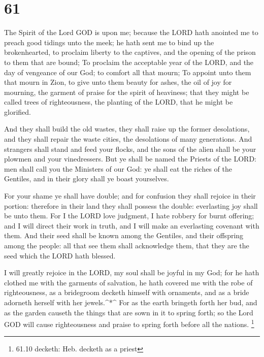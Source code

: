 \hypertarget{section-60}{%
\section{61}\label{section-60}}

 The Spirit of the Lord GOD is upon me; because the LORD
hath anointed me to preach good tidings unto the meek; he hath sent me
to bind up the brokenhearted, to proclaim liberty to the captives, and
the opening of the prison to them that are bound;  To
proclaim the acceptable year of the LORD, and the day of vengeance of
our God; to comfort all that mourn;  To appoint unto them
that mourn in Zion, to give unto them beauty for ashes, the oil of joy
for mourning, the garment of praise for the spirit of heaviness; that
they might be called trees of righteousness, the planting of the LORD,
that he might be glorified.

 And they shall build the old wastes, they shall raise up
the former desolations, and they shall repair the waste cities, the
desolations of many generations.  And strangers shall stand
and feed your flocks, and the sons of the alien shall be your plowmen
and your vinedressers.  But ye shall be named the Priests of
the LORD: men shall call you the Ministers of our God: ye shall eat the
riches of the Gentiles, and in their glory shall ye boast yourselves.

 For your shame ye shall have double; and for confusion they
shall rejoice in their portion: therefore in their land they shall
possess the double: everlasting joy shall be unto them.  For
I the LORD love judgment, I hate robbery for burnt offering; and I will
direct their work in truth, and I will make an everlasting covenant with
them.  And their seed shall be known among the Gentiles, and
their offspring among the people: all that see them shall acknowledge
them, that they are the seed which the LORD hath blessed.

 I will greatly rejoice in the LORD, my soul shall be
joyful in my God; for he hath clothed me with the garments of salvation,
he hath covered me with the robe of righteousness, as a bridegroom
decketh himself with ornaments, and as a bride adorneth herself with her
jewels.\^{}*\^{}  For as the earth bringeth forth her bud,
and as the garden causeth the things that are sown in it to spring
forth; so the Lord GOD will cause righteousness and praise to spring
forth before all the nations. \footnote{61.10 decketh: Heb. decketh as a
  priest}

